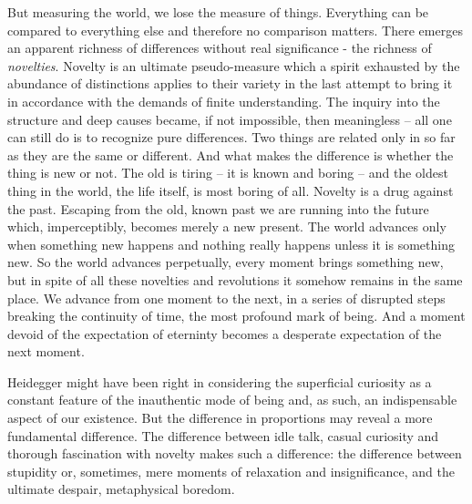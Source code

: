But measuring the world, we lose the measure of things. Everything can be
compared to everything else and therefore no comparison matters. There 
emerges an apparent richness of differences without real significance - the
richness of {\em novelties}. Novelty is an ultimate pseudo-measure which a spirit
exhausted by the abundance of distinctions applies to their variety in the
last attempt to bring it in accordance with the demands of finite 
understanding. The inquiry into the structure and deep causes became, if not
impossible, then meaningless -- all one can still do is to recognize pure
differences. Two things are related only in so far as they are the same or
different. And what makes the difference is whether the thing is new or not.
The old is tiring -- it is known and boring -- and the oldest thing in the 
world, the life itself, is most boring of all. Novelty is a drug against the 
past. Escaping from the old, known past we are running into the future which,
imperceptibly, becomes merely a new present. The world advances only when
something new happens and nothing really happens unless it is something new.
So the world advances perpetually, every moment brings something new, but in
spite of all these novelties and revolutions it somehow remains in the same
place. We advance from one moment to the next, in a series of disrupted steps
breaking the continuity of time, the most profound mark of being. And a moment
devoid of the expectation of eterninty becomes a desperate expectation of the
next moment.

Heidegger might have been right in considering the superficial curiosity as
a constant feature of the inauthentic mode of being and, as such, an 
indispensable aspect of our existence. But the difference in proportions may
reveal a more fundamental difference. The difference between idle talk, casual
curiosity and thorough fascination with novelty makes such a difference: the
difference between stupidity or, sometimes, mere moments of relaxation and
insignificance, and the ultimate despair, metaphysical boredom.

